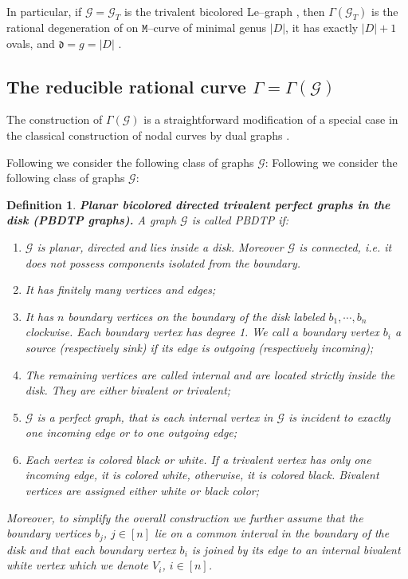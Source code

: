 \documentclass[11pt]{amsart}
\theoremstyle{plain}
\numberwithin{equation}{section}
\newtheorem{definition}{Definition}[subsection]
\begin{document}
In particular, if $\mathcal G= \mathcal G_T$ is the trivalent bicolored Le--graph \cite{Pos}, then $\Gamma(\mathcal G_T)$ is the rational degeneration of on $\mathtt M$--curve of minimal genus $|D|$, it has exactly $|D|+1$ ovals, and ${\mathfrak d}=g=|D|$ \cite{AG3}.

\subsection{The reducible rational curve $\Gamma=\Gamma(\mathcal G)$}
\label{sec:gamma}

The construction of $\Gamma(\mathcal G)$ is a straightforward modification of a special case in the classical construction of nodal curves by dual graphs \cite{ACG}.

Following \cite{Pos} we consider the following class of graphs ${\mathcal G}$:
Following \cite{Pos} we consider the following class of graphs ${\mathcal G}$:
\begin{definition}\label{def:graph} \textbf{Planar bicolored directed trivalent perfect graphs in the disk (PBDTP graphs).} A graph ${\mathcal G}$ is called PBDTP if:
\begin{enumerate}
\item  ${\mathcal G}$ is planar, directed and lies inside a disk. Moreover ${\mathcal G}$ is connected, i.e. it does not possess components isolated from the boundary.
\item It has finitely many vertices and edges;
\item It has $n$ boundary vertices on the boundary of the disk labeled $b_1,\cdots,b_n$ clockwise. Each boundary vertex has degree 1. We call a boundary vertex $b_i$ a source (respectively sink) if its edge is outgoing (respectively incoming);
\item The remaining vertices are called internal and are located strictly inside the disk. They are either bivalent or trivalent; 
\item ${\mathcal G}$ is a perfect graph, that is each internal vertex in  ${\mathcal G}$ is incident to exactly one incoming edge or to one outgoing edge;
\item Each vertex is colored black or white. If a trivalent vertex has only one incoming edge, it is colored white, otherwise, it is colored black. Bivalent vertices are assigned either white or black color;
\end{enumerate}
Moreover, to simplify the overall construction we further assume that the boundary vertices $b_j$, $j\in [n]$ lie on a common interval in the boundary of the disk and that each boundary vertex $b_{i}$ is joined by its edge to an internal bivalent white vertex which we denote $V_{i}$, $i\in [n]$. 
\end{definition}
\end{document}
